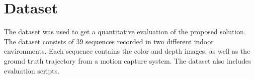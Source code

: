 \section{Dataset}

The dataset \cite{sturm12iros} was used to get a quantitative evaluation 
of the proposed solution. The dataset consists of 39 sequences recorded in
two different indoor environments. Each sequence contains
the color and depth images, as well as the ground truth
trajectory from a motion capture system. The dataset also includes evaluation 
scripts.
